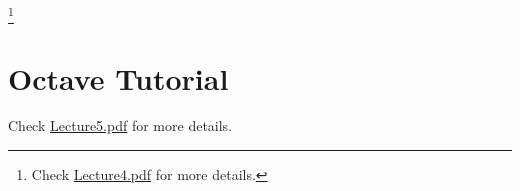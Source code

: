 \documentclass[a4paper, 12pt]{report}
\newcommand\blfootnote[1]{
	\begingroup
	\renewcommand\thefootnote{}\footnote{#1}
	\addtocounter{footnote}{-1}
	\endgroup
}
\begin{document}
\blfootnote{Check \href{lecture_pdf/Lecture4.pdf}{Lecture4.pdf} for more details.}

\chapter{Octave Tutorial}
Check \href{lecture_pdf/Lecture5.pdf}{Lecture5.pdf} for more details.

\begin{appendices}
\end{appendices}
\end{document}

